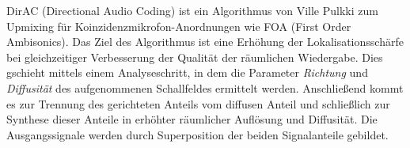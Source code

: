 DirAC (Directional Audio Coding) ist ein Algorithmus von Ville Pulkki \cite{Pulkki} zum Upmixing für Koinzidenzmikrofon-Anordnungen wie FOA (First Order Ambisonics). Das Ziel des Algorithmus ist eine Erhöhung der Lokalisationsschärfe bei gleichzeitiger Verbesserung der Qualität der räumlichen Wiedergabe. Dies gschieht mittels einem Analyseschritt, in dem die Parameter \textit{Richtung} und \textit{Diffusität} des aufgenommenen Schallfeldes ermittelt werden. Anschließend kommt es zur Trennung des gerichteten Anteils vom diffusen Anteil und schließlich zur Synthese dieser Anteile in erhöhter räumlicher Auflösung und Diffusität. Die Ausgangssignale werden durch Superposition der beiden Signalanteile gebildet.

